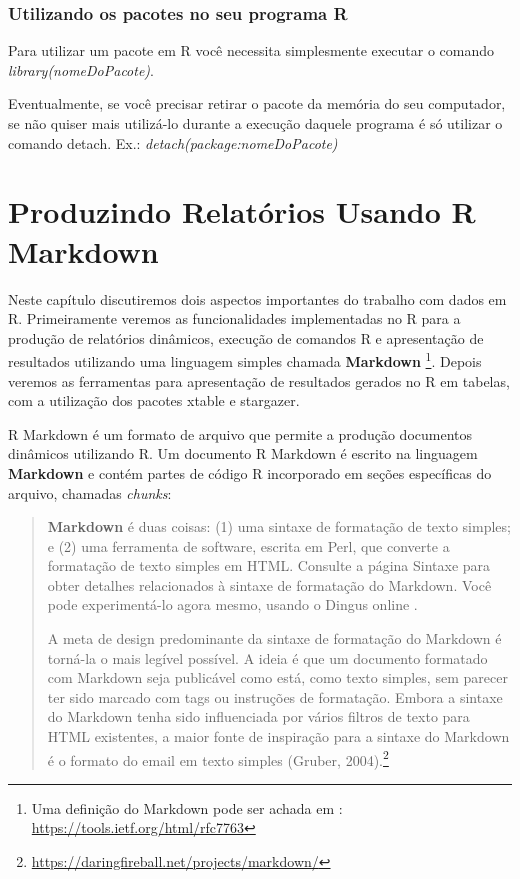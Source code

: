 \documentclass[12pt,a4paper,oneside]{erdc}
\begin{document}
\subsection{Utilizando os pacotes no seu programa R}

Para utilizar um pacote em R você necessita simplesmente executar o comando \textit{library(nomeDoPacote)}. 

Eventualmente, se você precisar retirar o pacote da memória do seu computador, se não quiser mais utilizá-lo durante a execução daquele programa é só utilizar o comando detach. Ex.: \textit{detach(package:nomeDoPacote)}








%
%
%



\chapter{Produzindo Relatórios Usando R Markdown}

	Neste capítulo discutiremos dois aspectos importantes do trabalho com dados em R. Primeiramente veremos as funcionalidades implementadas no R para a produção de relatórios dinâmicos, execução de comandos R e apresentação de resultados utilizando uma linguagem simples chamada \textbf{Markdown} \footnote{Uma definição do Markdown pode ser achada em : \url{https://tools.ietf.org/html/rfc7763}}. Depois veremos as ferramentas para apresentação de resultados gerados no R em tabelas, com a utilização dos pacotes xtable e stargazer.
		
	R Markdown é um formato de arquivo que permite a produção documentos dinâmicos utilizando R. Um documento R Markdown é escrito na linguagem \textbf{Markdown} e contém partes  de código R incorporado em seções específicas do arquivo, chamadas \textit{chunks}:
	\begin{quotation}
		\textbf{Markdown} é duas coisas: (1) uma sintaxe de formatação de texto simples; e (2) uma ferramenta de software, escrita em Perl, que converte a formatação de texto simples em HTML. Consulte a página Sintaxe para obter detalhes relacionados à sintaxe de formatação do Markdown. Você pode experimentá-lo agora mesmo, usando o Dingus online .
		
		A meta de design predominante da sintaxe de formatação do Markdown é torná-la o mais legível possível. A ideia é que um documento formatado com Markdown seja publicável como está, como texto simples, sem parecer ter sido marcado com tags ou instruções de formatação. Embora a sintaxe do Markdown tenha sido influenciada por vários filtros de texto para HTML existentes, a maior fonte de inspiração para a sintaxe do Markdown é o formato do email em texto simples (Gruber, 2004).\footnote{ \url{https://daringfireball.net/projects/markdown/}}
	\end{quotation}	
	
\end{document}
